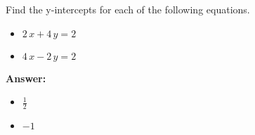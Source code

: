  Find the y-intercepts for each of the following equations. \begin{itemize}\item \( 2 \, x + 4 \, y = 2 \)\item \( 4 \, x - 2 \, y = 2 \)\end{itemize}

        \textbf{Answer:} \begin{itemize}\item \( \frac{1}{2} \)\item \( -1 \)\end{itemize}
